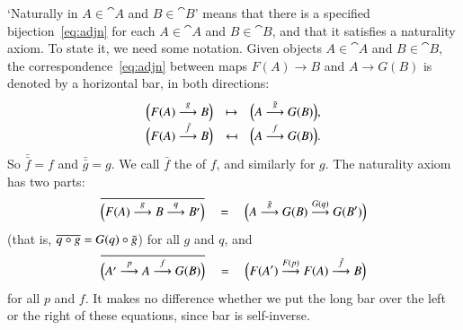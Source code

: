 `Naturally in $A \in \cat{A}$ and $B \in \cat{B}$' means that there is a
specified bijection~\eqref{eq:adjn} for each $A \in \cat{A}$ and $B \in
\cat{B}$, and that it satisfies a naturality axiom.  To state it, we need
some notation.  Given objects $A \in \cat{A}$ and $B \in \cat{B}$, the
correspondence~\eqref{eq:adjn} between maps $F(A) \to B$ and $A \to G(B)$
is denoted by a horizontal bar,%
%
%
in both directions:
\[
\begin{array}{ccc}
\Bigl(F(A) \toby{g} B\Bigr)             &
\mapsto	&
\Bigl(A \toby{\bar{g}} G(B)\Bigr),	\\
\Bigl(F(A) \toby{\bar{f}} B\Bigr)	&
\mapsfrom	&
\Bigl(A \toby{f} G(B)\Bigr).
\end{array}
\]
So $\bar{\bar{f}} = f$ and $\bar{\bar{g}} = g$.  We call
$\bar{f}$ the %
%
%
of $f$, and similarly for $g$.  The naturality%
%
%
axiom has two parts:
% 
\begin{equation}        
\label{eq:adj-nat-a}
\overline{\Bigl(F(A) \stackrel{g}{\longrightarrow} B \stackrel{q}{\longrightarrow} B'\Bigr)}
\quad
=
\quad
\Bigl(A \stackrel{\bar{g}}{\longrightarrow} G(B) \stackrel{G(q)}{\longrightarrow} G(B')\Bigr)
\end{equation}
% 
(that is, $\overline{q \mathbin{\circ} g} = G(q) \mathbin{\circ} \bar{g}$) for all $g$ and $q$, and 
% 
\begin{equation}        
\label{eq:adj-nat-b}
\overline{\Bigl(A' \stackrel{p}{\longrightarrow} A \stackrel{f}{\longrightarrow} G(B)\Bigr)}
\quad
=
\quad
\Bigl(F(A') \stackrel{F(p)}{\longrightarrow} F(A) \stackrel{\bar{f}}{\longrightarrow} B\Bigr)
\end{equation}
% 
for all $p$ and $f$.  It makes no difference whether we put the long bar
over the left or the right of these equations, since bar is self-inverse.


